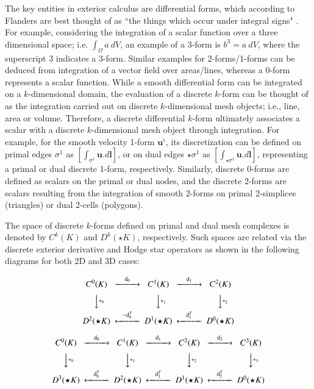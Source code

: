 \documentclass[final,12pt,times]{elsarticle}
\begin{document}
The key entities in exterior calculus are differential forms, which according to Flanders \cite{flanders2012differential} are best thought of as ``the things which occur under integral signs" \cite{perot2014differential}. For example, considering the integration of a scalar function over a three dimensional space; i.e. $\int_{\Omega} a \ dV$, an example of a 3-form is $b^3 = a \ dV$, where the superscript $3$ indicates a 3-form. Similar examples for 2-forms/1-forms can be deduced from integration of a vector field over areas/lines, whereas a 0-form represents a scalar function. While a smooth differential form can be integrated on a $k$-dimensional domain, the evaluation of a discrete $k$-form can be thought of as the integration carried out on discrete $k$-dimensional mesh objects; i.e., line, area or volume. Therefore, a discrete differential $k$-form ultimately associates a scalar with a discrete $k$-dimensional mesh object through integration. For example, for the smooth velocity 1-form $\mathbf{u}^\flat$, its discretization can be defined on primal edges $\sigma^1$ as $\left[ \int_{\sigma^1} \mathbf{u} . d \mathbf{l} \right]$, or on dual edges $\star \sigma^1$ as $\left[ \int_{\star \sigma^1} \mathbf{u} . d \mathbf{l} \right]$, representing a primal or dual discrete 1-form, respectively. Similarly, discrete 0-forms are defined as scalars on the primal or dual nodes, and the discrete 2-forms are scalars resulting from the integration of smooth 2-forms on primal 2-simplices (triangles) or dual 2-cells (polygons). 


The space of discrete $k$-forms defined on primal and dual mesh complexes is denoted by $C^k(K)$ and $D^k(\star K)$, respectively. Such spaces are related via the discrete exterior derivative and Hodge star operators as shown in the following diagrams for both 2D and 3D cases:

\begin{equation}
\label{eq:cochncmplx2d}
\begin{CD}
C^0(K) @> \textrm{d}_0>> C^1(K) @> \textrm{d}_1>> C^2(K) \\
@VV\ast_0 V    @VV\ast_1 V    @VV\ast_2 V \\
D^2(\star K) @<-\textrm{d}_0^T< < D^1(\star K) @<\textrm{d}_1^T< <
D^0(\star K)
\end{CD}
\end{equation}

\begin{equation}
\label{eq:cochncmplx3d}
\begin{CD}
C^0(K) @>\textrm{d}_0>> C^1(K) @>\textrm{d}_1>> C^2(K) @>\textrm{d}_2>> C^3(K)\\
@VV\ast_0 V    @VV\ast_1 V    @VV\ast_2 V @VV\ast_3 V \\
D^3(\star K) @<\textrm{d}_0^T< < D^2(\star K) @<\textrm{d}_1^T< <
D^1(\star K) @<\textrm{d}_2^T< < D^0(\star K)
\end{CD}
\end{equation}
\end{document}

